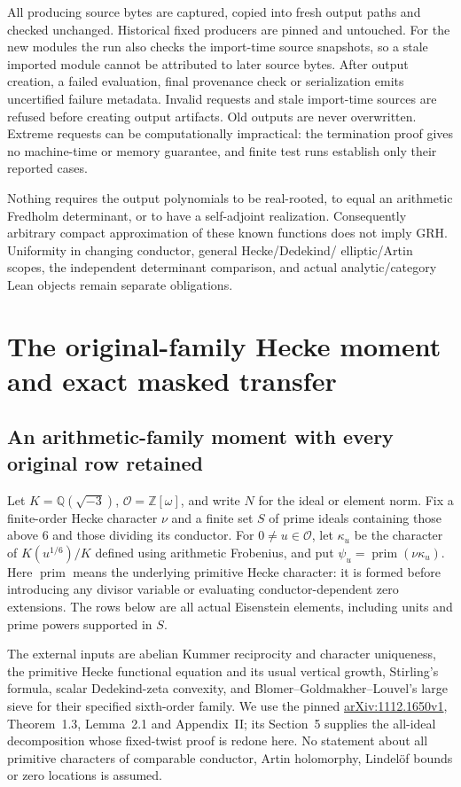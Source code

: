 \documentclass[11pt,oneside,openany]{book}
\theoremstyle{definition}\newtheorem{definition}[theorem]{Definition}
\theoremstyle{remark}\newtheorem{remark}[theorem]{Remark}
\begin{document}
All producing source bytes are captured, copied into fresh output paths and
checked unchanged. Historical fixed producers are pinned and untouched.
For the new modules the run also checks the import-time source snapshots,
so a stale imported module cannot be attributed to later source bytes.
After output creation, a failed evaluation, final provenance check or
serialization emits uncertified failure metadata. Invalid requests and stale
import-time sources are refused before creating output artifacts. Old
outputs are never overwritten. Extreme requests can be
computationally impractical: the termination proof gives no machine-time or
memory guarantee, and finite test runs establish only their reported cases.

Nothing requires the output polynomials to be real-rooted, to equal an
arithmetic Fredholm determinant, or to have a self-adjoint realization.
Consequently arbitrary compact approximation of these known functions does
not imply GRH. Uniformity in changing conductor, general Hecke/Dedekind/
elliptic/Artin scopes, the independent determinant comparison, and actual
analytic/category Lean objects remain separate obligations.


\chapter{The original-family Hecke moment and exact masked transfer}
\section{An arithmetic-family moment with every original row retained}
\label{mm:core}
Let $K=\mathbb Q(\sqrt{-3})$, $\mathcal O=\mathbb Z[\omega]$, and write
$N$ for the ideal or element norm. Fix a finite-order Hecke character
$\nu$ and a finite set $S$ of prime ideals containing those above $6$ and
those dividing its conductor. For $0\ne u\in\mathcal O$, let $\kappa_u$
be the character of $K(u^{1/6})/K$ defined using arithmetic Frobenius, and
put $\psi_u=\operatorname{prim}(\nu\kappa_u)$. Here
$\operatorname{prim}$ means the underlying primitive Hecke character:
it is formed before introducing any divisor variable or evaluating
conductor-dependent zero extensions. The rows below are all actual
Eisenstein elements, including units and prime powers supported in $S$.

The external inputs are abelian Kummer reciprocity and character
uniqueness, the primitive Hecke functional equation and its usual
vertical growth, Stirling's formula, scalar Dedekind-zeta convexity, and
Blomer--Goldmakher--Louvel's large sieve for their specified sixth-order
family. We use the pinned
\href{https://arxiv.org/pdf/1112.1650v1}{arXiv:1112.1650v1},
Theorem~1.3, Lemma~2.1 and Appendix~II; its Section~5 supplies the
all-ideal decomposition whose fixed-twist proof is redone here.
No statement about all primitive characters of comparable conductor,
Artin holomorphy, Lindel\"of bounds or zero locations is assumed.
\end{document}
